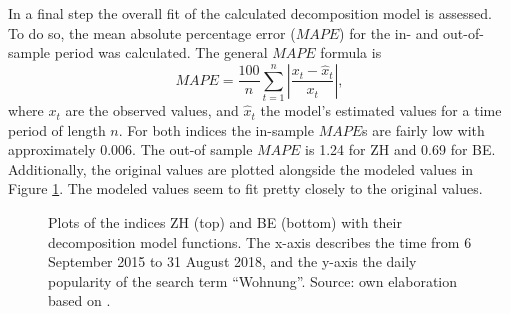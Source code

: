 \documentclass[11pt]{article}
\begin{document}
In a final step the overall fit of the calculated decomposition model is assessed. To do so, the mean absolute percentage error (\(MAPE\)) for the in- and out-of-sample period was calculated. The general \(MAPE\) formula is
\begin{equation}
	MAPE=\frac{100}{n}\sum_{t=1}^{n} \left|\frac{x_t-\hat{x}_t}{x_t}\right|,
\end{equation}
where \({x_t}\) are the observed values, and \(\hat{x}_t\) the model's estimated values for a time period of length \(n\). For both indices the in-sample \(MAPE\)s are fairly low with approximately 0.006. The out-of sample \(MAPE\) is 1.24 for ZH and 0.69 for BE. Additionally, the original values are plotted alongside the modeled values in Figure \ref{fig:finalModel}. The modeled values seem to fit pretty closely to the original values.
\begin{figure}[h]
	\begin{minipage}{1\linewidth}
		\centering
	\end{minipage}	\begin{minipage}{1\linewidth}
		\centering
	\end{minipage}
	\caption{Plots of the indices ZH (top) and BE (bottom) with their decomposition model functions. The x-axis describes the time from 6 September 2015 to 31 August 2018, and the y-axis the daily popularity of the search term ``Wohnung''. Source: own elaboration based on \cite{googleT}.}
	\label{fig:finalModel}
\end{figure}
\end{document}
